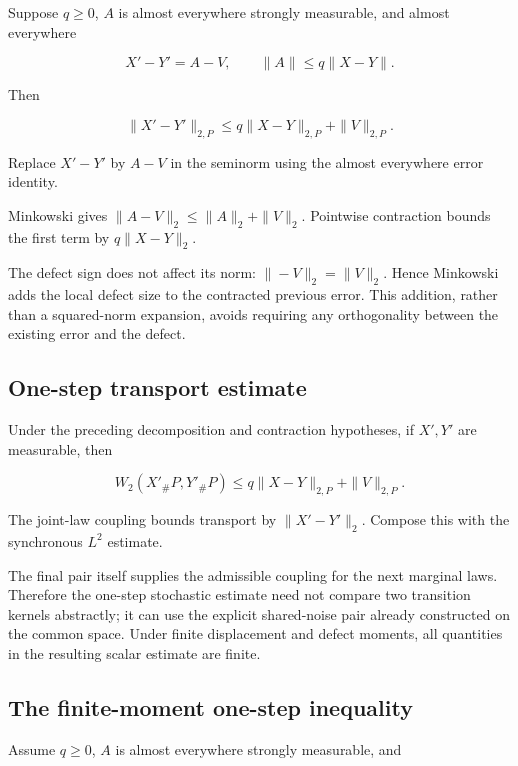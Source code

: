 \documentclass[11pt,a4paper]{report}
\begin{document}
Suppose \(q\ge0\), \(A\) is almost everywhere strongly measurable, and almost everywhere

\[X'-Y'=A-V,\qquad\|A\|\le q\|X-Y\|.\]

Then

\[\|X'-Y'\|_{2,P}\le q\|X-Y\|_{2,P}+\|V\|_{2,P}.\]

Replace \(X'-Y'\) by \(A-V\) in the seminorm using the almost everywhere error identity.



Minkowski gives \(\|A-V\|_2\le\|A\|_2+\|V\|_2\). Pointwise contraction bounds the first term by \(q\|X-Y\|_2\).



The defect sign does not affect its norm: \(\|-V\|_2=\|V\|_2\). Hence Minkowski adds the local defect size to the contracted previous error. This addition, rather than a squared-norm expansion, avoids requiring any orthogonality between the existing error and the defect.

\subsection{\texorpdfstring{One-step transport estimate}{One-step transport estimate}}
\label{report-step-UnadjustedLangevin-Coupling-lean-16}


Under the preceding decomposition and contraction hypotheses, if \(X',Y'\) are measurable, then

\[W_2(X'_\#P,Y'_\#P)\le q\|X-Y\|_{2,P}+\|V\|_{2,P}.\]

The joint-law coupling bounds transport by \(\|X'-Y'\|_2\). Compose this with the synchronous \(L^2\) estimate.



The final pair itself supplies the admissible coupling for the next marginal laws. Therefore the one-step stochastic estimate need not compare two transition kernels abstractly; it can use the explicit shared-noise pair already constructed on the common space. Under finite displacement and defect moments, all quantities in the resulting scalar estimate are finite.

\subsection{\texorpdfstring{The finite-moment one-step inequality}{The finite-moment one-step inequality}}
\label{report-step-UnadjustedLangevin-Coupling-lean-17}


Assume \(q\ge0\), \(A\) is almost everywhere strongly measurable, and
\end{document}
